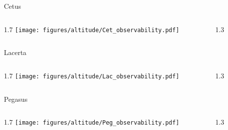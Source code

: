 \documentclass[final]{beamer}
\newlength{\colwidth}
\begin{document}
\begin{frame}[t]{}
  \Large{Cetus}
  \begin{columns}[T]
    \begin{column}{1.7\colwidth}
      \centering
      \texttt{[image: figures/altitude/Cet\_observability.pdf]}
    \end{column}
    \begin{column}{1.3\colwidth}
      \Large
      
    \end{column}
  \end{columns}

  \Large{Lacerta}
  \begin{columns}[T]
    \begin{column}{1.7\colwidth}
      \centering
      \texttt{[image: figures/altitude/Lac\_observability.pdf]}
    \end{column}
    \begin{column}{1.3\colwidth}
      \Large
      
    \end{column}
  \end{columns}

  \Large{Pegasus}
  \begin{columns}[T]
    \begin{column}{1.7\colwidth}
      \centering
      \texttt{[image: figures/altitude/Peg\_observability.pdf]}
    \end{column}
    \begin{column}{1.3\colwidth}
      \Large
      
    \end{column}
  \end{columns}
\end{frame}

\end{document}
